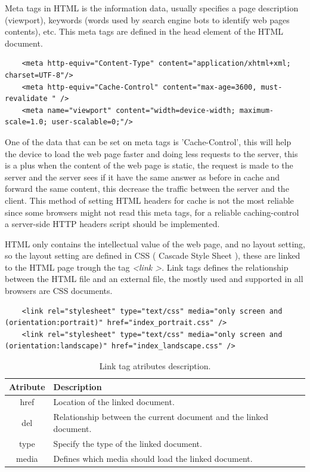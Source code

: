 Meta tags in HTML is the information data, usually specifies a page description (viewport), keywords (words used by search engine bots to identify web pages contents), etc. This meta tags are defined in the head element of the HTML document. 

\begin{lstlisting}
	<meta http-equiv="Content-Type" content="application/xhtml+xml; charset=UTF-8"/>
	<meta http-equiv="Cache-Control" content="max-age=3600, must-revalidate " />
	<meta name="viewport" content="width=device-width; maximum-scale=1.0; user-scalable=0;"/>
\end{lstlisting}

One of the data that can be set on meta tags is 'Cache-Control', this will help the device to load the web page faster and doing less requests to the server, this is a plus when the content of the web page is static, the request is made to the server and the server sees if it have the same answer as before in cache and forward the same content, this decrease the traffic between the server and the client. This method of setting HTML headers for cache is not the most reliable since some browsers might not read this meta tags, for a reliable caching-control a server-side HTTP headers script should be implemented.

HTML only contains the intellectual value of the web page, and no layout setting, so the layout setting are defined in CSS ( Cascade Style Sheet ), these are linked to the HTML page trough the tag \textit{\textless link \textgreater}.  Link tags defines the relationship between the HTML file and an external file, the mostly used and supported in all browsers are CSS documents.

\begin{lstlisting}
	<link rel="stylesheet" type="text/css" media="only screen and (orientation:portrait)" href="index_portrait.css" />
	<link rel="stylesheet" type="text/css" media="only screen and (orientation:landscape)" href="index_landscape.css" />
\end{lstlisting}

\begin{table}[h!]
\begin{tabular}{ | c | l | }
\hline
\textbf{Atribute} & \textbf{Description} \\ \hline
href & Location of the linked document. \\ \hline
del & Relationship between the current document and the linked document. \\ \hline
type & Specify the type of the linked document. \\ \hline
media & Defines which media should load the linked document. \\ \hline
\end{tabular}
\caption{Link tag atributes description.}
\end{table}

